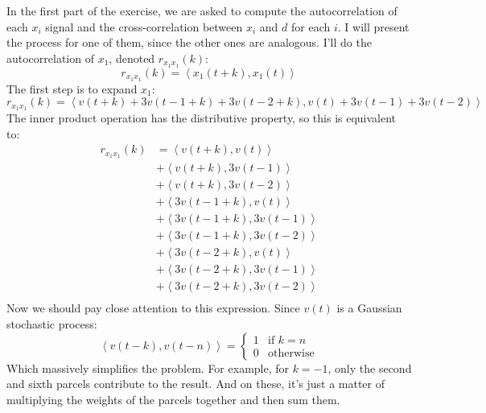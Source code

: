 In the first part of the exercise, we are asked to compute the autocorrelation of
each \(x_i\) signal and the cross-correlation between \(x_i\) and \(d\) for each
\(i\). I will present the process for one of them, since the other ones are
analogous. I'll do the autocorrelation of \(x_1\), denoted \(r_{x_1x_1}(k)\):
\begin{equation}
    r_{x_1x_1}(k) = \left< x_1 (t+k), x_1(t) \right>
\end{equation}
The first step is to expand \(x_1\):
\begin{equation}
    r_{x_1x_1}(k) = \left< v(t+k) + 3v(t-1+k) + 3v(t-2+k),
    v(t) + 3v(t-1) + 3v(t-2) \right>
\end{equation}
The inner product operation has the distributive property, so this is equivalent
to:
\begin{equation}
    \begin{aligned}
        r_{x_1x_1}(k) & = \left< v(t+k), v(t) \right>        \\
                      & + \left< v(t+k), 3v(t-1) \right>     \\
                      & + \left< v(t+k),  3v(t-2) \right>    \\
                      & + \left< 3v(t-1+k), v(t) \right>     \\
                      & + \left< 3v(t-1+k), 3v(t-1) \right>  \\
                      & +\left< 3v(t-1+k),  3v(t-2) \right>  \\
                      & + \left< 3v(t-2+k), v(t) \right>     \\
                      & + \left< 3v(t-2+k), 3v(t-1) \right>  \\
                      & + \left< 3v(t-2+k),  3v(t-2) \right> \\
    \end{aligned}
\end{equation}
Now we should pay close attention to this expression. Since \(v(t)\) is a Gaussian
stochastic process:
\begin{equation}
    \left<v(t-k),v(t-n)\right>=\begin{cases}
        1 & \text{if~} k=n   \\
        0 & \text{otherwise}
    \end{cases}
\end{equation}
Which massively simplifies the problem. For example, for \(k=-1\), only the second
and sixth parcels contribute to the result. And on these, it's just a matter of
multiplying the weights of the parcels together and then sum them.

